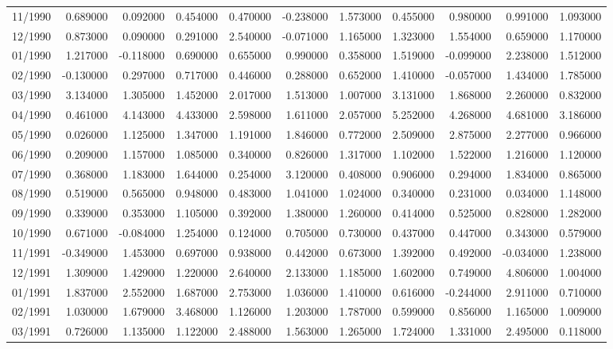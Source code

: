 \begin{tabular}{lrrrrrrrrrr}
11/1990 & 0.689000 & 0.092000 & 0.454000 & 0.470000 & -0.238000 & 1.573000 & 0.455000 & 0.980000 & 0.991000 & 1.093000 \\
12/1990 & 0.873000 & 0.090000 & 0.291000 & 2.540000 & -0.071000 & 1.165000 & 1.323000 & 1.554000 & 0.659000 & 1.170000 \\
01/1990 & 1.217000 & -0.118000 & 0.690000 & 0.655000 & 0.990000 & 0.358000 & 1.519000 & -0.099000 & 2.238000 & 1.512000 \\
02/1990 & -0.130000 & 0.297000 & 0.717000 & 0.446000 & 0.288000 & 0.652000 & 1.410000 & -0.057000 & 1.434000 & 1.785000 \\
03/1990 & 3.134000 & 1.305000 & 1.452000 & 2.017000 & 1.513000 & 1.007000 & 3.131000 & 1.868000 & 2.260000 & 0.832000 \\
04/1990 & 0.461000 & 4.143000 & 4.433000 & 2.598000 & 1.611000 & 2.057000 & 5.252000 & 4.268000 & 4.681000 & 3.186000 \\
05/1990 & 0.026000 & 1.125000 & 1.347000 & 1.191000 & 1.846000 & 0.772000 & 2.509000 & 2.875000 & 2.277000 & 0.966000 \\
06/1990 & 0.209000 & 1.157000 & 1.085000 & 0.340000 & 0.826000 & 1.317000 & 1.102000 & 1.522000 & 1.216000 & 1.120000 \\
07/1990 & 0.368000 & 1.183000 & 1.644000 & 0.254000 & 3.120000 & 0.408000 & 0.906000 & 0.294000 & 1.834000 & 0.865000 \\
08/1990 & 0.519000 & 0.565000 & 0.948000 & 0.483000 & 1.041000 & 1.024000 & 0.340000 & 0.231000 & 0.034000 & 1.148000 \\
09/1990 & 0.339000 & 0.353000 & 1.105000 & 0.392000 & 1.380000 & 1.260000 & 0.414000 & 0.525000 & 0.828000 & 1.282000 \\
10/1990 & 0.671000 & -0.084000 & 1.254000 & 0.124000 & 0.705000 & 0.730000 & 0.437000 & 0.447000 & 0.343000 & 0.579000 \\
11/1991 & -0.349000 & 1.453000 & 0.697000 & 0.938000 & 0.442000 & 0.673000 & 1.392000 & 0.492000 & -0.034000 & 1.238000 \\
12/1991 & 1.309000 & 1.429000 & 1.220000 & 2.640000 & 2.133000 & 1.185000 & 1.602000 & 0.749000 & 4.806000 & 1.004000 \\
01/1991 & 1.837000 & 2.552000 & 1.687000 & 2.753000 & 1.036000 & 1.410000 & 0.616000 & -0.244000 & 2.911000 & 0.710000 \\
02/1991 & 1.030000 & 1.679000 & 3.468000 & 1.126000 & 1.203000 & 1.787000 & 0.599000 & 0.856000 & 1.165000 & 1.009000 \\
03/1991 & 0.726000 & 1.135000 & 1.122000 & 2.488000 & 1.563000 & 1.265000 & 1.724000 & 1.331000 & 2.495000 & 0.118000 \\

\end{tabular}
